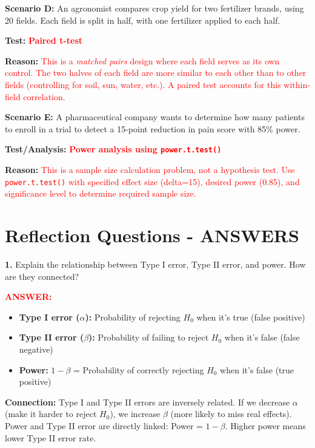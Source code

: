 \documentclass[11pt]{article}
\begin{document}
\textbf{Scenario D:} An agronomist compares crop yield for two fertilizer brands, using 20 fields. Each field is split in half, with one fertilizer applied to each half.

\textbf{Test:} \textcolor{red}{\textbf{Paired t-test}}

\textbf{Reason:} \textcolor{red}{This is a \textit{matched pairs} design where each field serves as its own control. The two halves of each field are more similar to each other than to other fields (controlling for soil, sun, water, etc.). A paired test accounts for this within-field correlation.}

\vspace{0.5cm}

\textbf{Scenario E:} A pharmaceutical company wants to determine how many patients to enroll in a trial to detect a 15-point reduction in pain score with 85\% power.

\textbf{Test/Analysis:} \textcolor{red}{\textbf{Power analysis using \texttt{power.t.test()}}}

\textbf{Reason:} \textcolor{red}{This is a sample size calculation problem, not a hypothesis test. Use \texttt{power.t.test()} with specified effect size (delta=15), desired power (0.85), and significance level to determine required sample size.}

\newpage

\section*{Reflection Questions - ANSWERS}

\textbf{1.} Explain the relationship between Type I error, Type II error, and power. How are they connected?

\textcolor{red}{\textbf{ANSWER:}}
\begin{itemize}
\item \textbf{Type I error ($\alpha$):} Probability of rejecting $H_0$ when it's true (false positive)
\item \textbf{Type II error ($\beta$):} Probability of failing to reject $H_0$ when it's false (false negative)
\item \textbf{Power:} $1 - \beta$ = Probability of correctly rejecting $H_0$ when it's false (true positive)
\end{itemize}

\textbf{Connection:} Type I and Type II errors are inversely related. If we decrease $\alpha$ (make it harder to reject $H_0$), we increase $\beta$ (more likely to miss real effects). Power and Type II error are directly linked: Power = $1 - \beta$. Higher power means lower Type II error rate.
\end{document}
